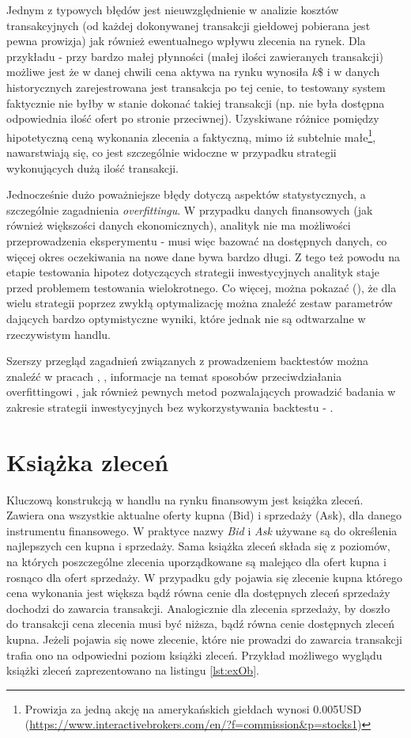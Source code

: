 \documentclass[a4paper,12pt,openany, DIV=calc, headsepline]{scrbook}
\begin{document}
Jednym z typowych błędów jest nieuwzględnienie w analizie kosztów transakcyjnych (od każdej dokonywanej transakcji giełdowej pobierana jest pewna prowizja) jak również ewentualnego wpływu zlecenia na rynek. Dla przykładu - przy bardzo małej płynności (małej ilości zawieranych transakcji) możliwe jest że w danej chwili cena aktywa na rynku wynosiła $k$\$ i w danych historycznych zarejestrowana jest transakcja po tej cenie, to testowany system faktycznie nie byłby w stanie dokonać takiej transakcji (np. nie była dostępna odpowiednia ilość ofert po stronie przeciwnej). Uzyskiwane różnice pomiędzy hipotetyczną ceną wykonania zlecenia a faktyczną, mimo iż subtelnie małe\footnote{Prowizja za jedną akcję na amerykańskich giełdach wynosi 0.005USD (\url{https://www.interactivebrokers.com/en/?f=commission&p=stocks1})}, nawarstwiają się, co jest szczególnie widoczne w przypadku strategii wykonujących dużą ilość transakcji.

Jednocześnie dużo poważniejsze błędy dotyczą aspektów statystycznych, a szczególnie zagadnienia \emph{overfittingu}. W przypadku danych finansowych (jak również większości danych ekonomicznych), analityk nie ma możliwości przeprowadzenia eksperymentu - musi więc bazować na dostępnych danych, co więcej okres oczekiwania na nowe dane bywa bardzo długi. Z tego też powodu na etapie testowania hipotez dotyczących strategii inwestycyjnych analityk staje przed problemem testowania wielokrotnego. Co więcej, można pokazać (\citep{bailey2013pseudo}), że dla wielu strategii poprzez zwykłą optymalizację można znaleźć zestaw parametrów dających bardzo optymistyczne wyniki, które jednak nie są odtwarzalne w rzeczywistym handlu.

Szerszy przegląd zagadnień związanych z prowadzeniem backtestów można znaleźć w pracach \citep{lopez2015backtesting}, \citep{bailey2014statistical}, informacje na temat sposobów przeciwdziałania overfittingowi \citep{bailey2014probability}, jak również pewnych metod pozwalających prowadzić badania w zakresie strategii inwestycyjnych bez wykorzystywania backtestu - \citep{carr2014determining}.


\section{Książka zleceń}


Kluczową konstrukcją w handlu na rynku finansowym jest książka zleceń. Zawiera ona wszystkie aktualne oferty kupna (Bid) i sprzedaży (Ask), dla danego instrumentu finansowego. W praktyce nazwy \emph{Bid} i \emph{Ask} używane są do określenia najlepszych cen kupna i sprzedaży. Sama książka zleceń składa się z poziomów, na których poszczególne zlecenia uporządkowane są malejąco dla ofert kupna i rosnąco dla ofert sprzedaży. W przypadku gdy pojawia się zlecenie kupna którego cena wykonania jest większa bądź równa cenie dla dostępnych zleceń sprzedaży dochodzi do zawarcia transakcji. Analogicznie dla zlecenia sprzedaży, by doszło do transakcji cena zlecenia musi być niższa, bądź równa cenie dostępnych zleceń kupna. Jeżeli pojawia się nowe zlecenie, które nie prowadzi do zawarcia transakcji trafia ono na odpowiedni poziom książki zleceń. Przykład możliwego wyglądu książki zleceń zaprezentowano na listingu \ref{lst:exOb}.
\end{document}
